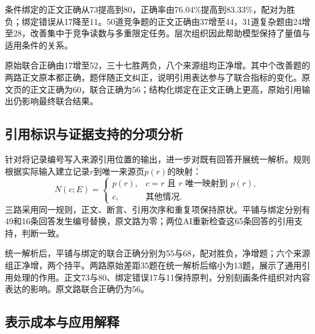 \begin{table}[htbp]
\centering\small
\caption{三种证据表示的回答结果；每路分母为96}
\label{tab:coverage-answer}
\CoverageAnswerTable
\end{table}

条件绑定的正文正确从73提高到80，正确率由76.04\%提高到83.33\%，配对为\CoverageAnswerWins{}胜\CoverageAnswerLosses{}负；绑定错误从17降至11。50道竞争题的正文正确由37增至44，31道复杂题由24增至28，改善集中于竞争读数与多重限定任务。层次组织因此帮助模型保持了量值与适用条件的关系。

原始联合正确由17增至52，三十七胜两负，八个来源组均正净增。其中\CoverageJointAlreadyCorrectWins{}个改善题的两路正文原本都正确，\CoverageJointAnswerWins{}题伴随正文纠正，说明引用表达参与了联合指标的变化。原文页的正文正确为60，联合正确为56；结构化绑定在正文正确上更高，原始引用输出仍影响最终联合结果。

\subsection{引用标识与证据支持的分项分析}

针对将记录编号写入来源引用位置的输出，进一步对既有回答开展统一解析。规则根据实际输入建立记录$r$到唯一来源页$p(r)$的映射：
\begin{equation}
 N(c;E)=
 \begin{cases}
 p(r),&c=r\text{ 且 }r\text{ 唯一映射到 }p(r),\\
 c,&\text{其他情况}.
 \end{cases}
\end{equation}
三路采用同一规则，正文、断言、引用次序和重复项保持原状。平铺与绑定分别有49和16条回答发生编号替换，原文路为零；两位AI重新检查这65条回答的引用支持，判断一致。

\begin{table}[htbp]
\centering\small
\caption{统一引用解析前后的联合正确；事后分析，每路分母为96}
\label{tab:coverage-citation}
\CoverageCitationTable
\end{table}

统一解析后，平铺与绑定的联合正确分别为55与68，配对\CoverageResolvedWins{}胜\CoverageResolvedLosses{}负，净增\CoverageResolvedNet{}题；六个来源组正净增，两个持平。两路原始差距35题在统一解析后缩小为13题，展示了通用引用处理的作用。正文73与80、绑定错误17与11保持原判，分别刻画条件组织对内容表达的影响。原文路联合正确仍为56。

\subsection{表示成本与应用解释}


